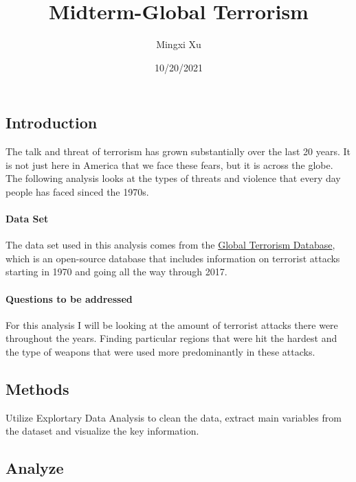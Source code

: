 \documentclass[
]{article}
\title{Midterm-Global Terrorism}
\author{Mingxi Xu}
\date{10/20/2021}
\begin{document}
\maketitle

{
\setcounter{tocdepth}{3}
\tableofcontents
}
\hypertarget{introduction}{%
\subsection{Introduction}\label{introduction}}

The talk and threat of terrorism has grown substantially over the last
20 years. It is not just here in America that we face these fears, but
it is across the globe. The following analysis looks at the types of
threats and violence that every day people has faced sinced the 1970s.

\hypertarget{data-set}{%
\paragraph{Data Set}\label{data-set}}

The data set used in this analysis comes from the
\href{https://www.kaggle.com/START-UMD/gtd}{Global Terrorism Database},
which is an open-source database that includes information on terrorist
attacks starting in 1970 and going all the way through 2017.

\hypertarget{questions-to-be-addressed}{%
\paragraph{Questions to be addressed}\label{questions-to-be-addressed}}

For this analysis I will be looking at the amount of terrorist attacks
there were throughout the years. Finding particular regions that were
hit the hardest and the type of weapons that were used more
predominantly in these attacks.

\hypertarget{methods}{%
\subsection{Methods}\label{methods}}

Utilize Explortary Data Analysis to clean the data, extract main
variables from the dataset and visualize the key information.

\hypertarget{analyze}{%
\subsection{Analyze}\label{analyze}}
\end{document}
